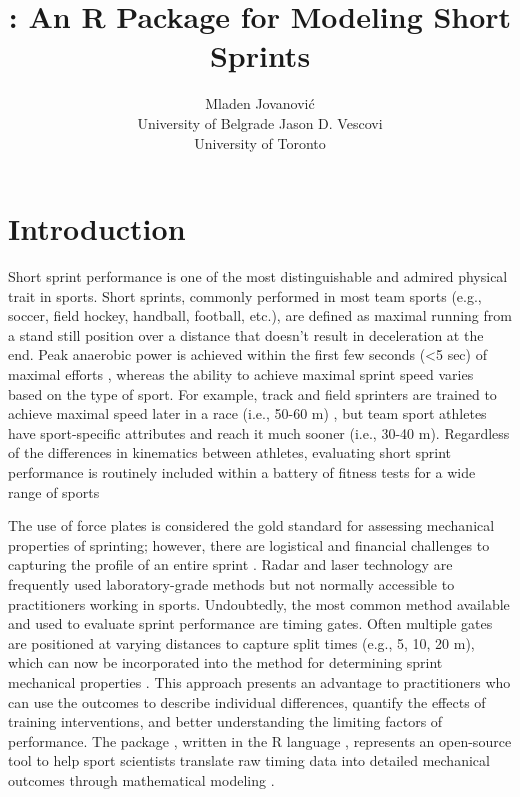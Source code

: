 \documentclass[
]{jss}
\author{
Mladen Jovanović\\University of Belgrade \And Jason D. Vescovi\\University of Toronto
}
\title{\pkg{shorts}: An R Package for Modeling Short Sprints}
\begin{document}
\hypertarget{introduction}{%
\section{Introduction}\label{introduction}}

Short sprint performance is one of the most distinguishable and admired physical trait in sports. Short sprints, commonly performed in most team sports (e.g., soccer, field hockey, handball, football, etc.), are defined as maximal running from a stand still position over a distance that doesn't result in deceleration at the end. Peak anaerobic power is achieved within the first few seconds (\textless5 sec) of maximal efforts \citep{mangineSpeedForcePower2014}, whereas the ability to achieve maximal sprint speed varies based on the type of sport. For example, track and field sprinters are trained to achieve maximal speed later in a race (i.e., 50-60 m) \citep{ward-smithEnergyConversionStrategies2001}, but team sport athletes have sport-specific attributes and reach it much sooner (i.e., 30-40 m)\citep{brownAssessmentLinearSprinting2004}. Regardless of the differences in kinematics between athletes, evaluating short sprint performance is routinely included within a battery of fitness tests for a wide range of sports

The use of force plates is considered the gold standard for assessing mechanical properties of sprinting; however, there are logistical and financial challenges to capturing the profile of an entire sprint \citep{morinSimpleMethodComputing2019, samozinoSimpleMethodMeasuring2016}. Radar and laser technology are frequently used laboratory-grade methods \citep{buchheitMechanicalDeterminantsAcceleration2014, edwardsSprintAccelerationCharacteristics2020, jimenez-reyesRelationshipVerticalHorizontal2018, marcote-pequenoAssociationForceVelocity2019} but not normally accessible to practitioners working in sports. Undoubtedly, the most common method available and used to evaluate sprint performance are timing gates. Often multiple gates are positioned at varying distances to capture split times (e.g., 5, 10, 20 m), which can now be incorporated into the method for determining sprint mechanical properties \citep{morinSimpleMethodComputing2019, samozinoSimpleMethodMeasuring2016}. This approach presents an advantage to practitioners who can use the outcomes to describe individual differences, quantify the effects of training interventions, and better understanding the limiting factors of performance. The  package \citep{R-shorts}, written in the R language \citep{R-base}, represents an open-source tool to help sport scientists translate raw timing data into detailed mechanical outcomes through mathematical modeling \citep{morinSimpleMethodComputing2019, samozinoSimpleMethodMeasuring2016}.
\end{document}
